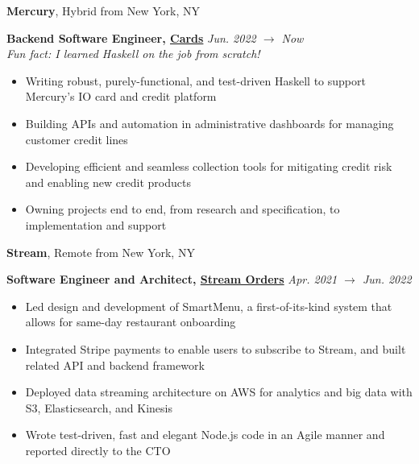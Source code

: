 \documentclass[10pt]{article}
\begin{document}
\begin{flushleft}
		\textbf{Mercury}, Hybrid from New York, NY\\
		\begin{leftli}
			{\small \textbf{Backend Software Engineer, \href{https://mercury.com/credit}{Cards}}} \hfill \textit{\small Jun. 2022 $\rightarrow$ Now}\\
			{\footnotesize \textit{Fun fact: I learned Haskell on the job from scratch!}}
			\begin{itemize}
				\item Writing robust, purely-functional, and test-driven Haskell to support Mercury's IO card and credit platform
				\vspace{-2mm}
				\item Building APIs and automation in administrative dashboards for managing customer credit lines
				\vspace{-2mm}
				\item Developing efficient and seamless collection tools for mitigating credit risk and enabling new credit products
				\vspace{-2mm}
				\item Owning projects end to end, from research and specification, to implementation and support
			\end{itemize}


		\end{leftli}

		\vspace{-1.50mm}
		\textbf{Stream}, Remote from New York, NY\\
		\begin{leftli}
			{\small \textbf{Software Engineer and Architect, \href{https://www.streamorders.com/}{Stream Orders}}} \hfill \textit{\small Apr. 2021 $\rightarrow$ Jun. 2022}
			\begin{itemize}
				\item Led design and development of SmartMenu, a first-of-its-kind system that allows for same-day restaurant onboarding
				\vspace{-2mm}
				\item Integrated Stripe payments to enable users to subscribe to Stream, and built related API and backend framework
				\vspace{-2mm}
				\item Deployed data streaming architecture on AWS for analytics and big data with S3, Elasticsearch, and Kinesis
				\vspace{-2mm}
				\item Wrote test-driven, fast and elegant Node.js code in an Agile manner and reported directly to the CTO
			\end{itemize}
		\end{leftli}


\end{flushleft}
\end{document}
